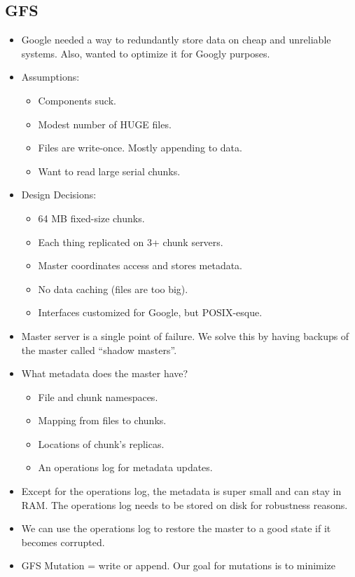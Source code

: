 \documentclass{scrartcl}
\begin{document}
\subsection*{GFS}
\begin{itemize}
\item Google needed a way to redundantly store data on cheap and unreliable
	systems. Also, wanted to optimize it for Googly purposes.
\item Assumptions:
	\begin{itemize}
	\item Components suck.
	\item Modest number of HUGE files.
	\item Files are write-once. Mostly appending to data.
	\item Want to read large serial chunks.
	\end{itemize}
\item Design Decisions:
	\begin{itemize}
	\item 64 MB fixed-size chunks.
	\item Each thing replicated on 3+ chunk servers.
	\item Master coordinates access and stores metadata.
	\item No data caching (files are too big).
	\item Interfaces customized for Google, but POSIX-esque.
	\end{itemize}
\item Master server is a single point of failure. We solve this by having
	backups of the master called ``shadow masters''.
\item What metadata does the master have?
	\begin{itemize}
	\item File and chunk namespaces.
	\item Mapping from files to chunks.
	\item Locations of chunk's replicas.
	\item An operations log for metadata updates.
	\end{itemize}
\item Except for the operations log, the metadata is super small and can stay in
	RAM. The operations log needs to be stored on disk for robustness reasons.
\item We can use the operations log to restore the master to a good state if
	it becomes corrupted.
\item GFS Mutation = write or append. Our goal for mutations is to minimize

\end{itemize}
\end{document}
